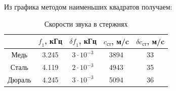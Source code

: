 \documentclass{article}
\begin{document}
Из графика методом наименьших квадратов получаем:
\begin{table}[h!]
\begin{center}
\caption{Скорости звука в стержнях}
\begin{tabular}{|c|c|c|c|c|}
\hline
 & $\textit{f}_1$, кГц& $\delta\textit{f}_1$, кГц& $c_{ст}$, м/c& $\delta c_{ст}$, м/c\\ 
\hline
 Медь& 3.245& $3 \cdot 10^{-3}$& 3894& 33\\
\hline 
 Сталь& 4.119& $2 \cdot 10^{-3}$& 4943& 35\\
\hline 
 Дюраль& 4.245& $3 \cdot 10^{-3}$& 5094& 36\\
\hline 
\end{tabular}
\end{center}
\end{table}

\newpage
\end{document}
